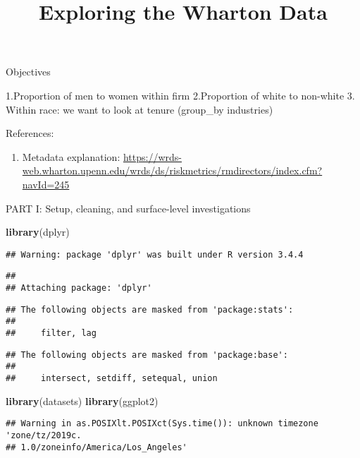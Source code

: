 \documentclass[]{article}
\title{Exploring the Wharton Data}
\author{}
\date{}
\newenvironment{Shaded}{\begin{snugshade}}{\end{snugshade}}
\newcommand{\KeywordTok}[1]{\textcolor[rgb]{0.13,0.29,0.53}{\textbf{#1}}}
\newcommand{\NormalTok}[1]{#1}
\providecommand{\tightlist}{%
  \setlength{\itemsep}{0pt}\setlength{\parskip}{0pt}}
\begin{document}
\maketitle

Objectives

1.Proportion of men to women within firm 2.Proportion of white to
non-white 3. Within race: we want to look at tenure (group\_by
industries)

References:

\begin{enumerate}
\def\labelenumi{\arabic{enumi}.}
\tightlist
\item
  Metadata explanation:
  \url{https://wrds-web.wharton.upenn.edu/wrds/ds/riskmetrics/rmdirectors/index.cfm?navId=245}
\end{enumerate}

PART I: Setup, cleaning, and surface-level investigations

\begin{Shaded}
\begin{Highlighting}[]
\KeywordTok{library}\NormalTok{(dplyr)}
\end{Highlighting}
\end{Shaded}

\begin{verbatim}
## Warning: package 'dplyr' was built under R version 3.4.4
\end{verbatim}

\begin{verbatim}
## 
## Attaching package: 'dplyr'
\end{verbatim}

\begin{verbatim}
## The following objects are masked from 'package:stats':
## 
##     filter, lag
\end{verbatim}

\begin{verbatim}
## The following objects are masked from 'package:base':
## 
##     intersect, setdiff, setequal, union
\end{verbatim}

\begin{Shaded}
\begin{Highlighting}[]
\KeywordTok{library}\NormalTok{(datasets)}
\KeywordTok{library}\NormalTok{(ggplot2)}
\end{Highlighting}
\end{Shaded}

\begin{verbatim}
## Warning in as.POSIXlt.POSIXct(Sys.time()): unknown timezone 'zone/tz/2019c.
## 1.0/zoneinfo/America/Los_Angeles'
\end{verbatim}
\end{document}
